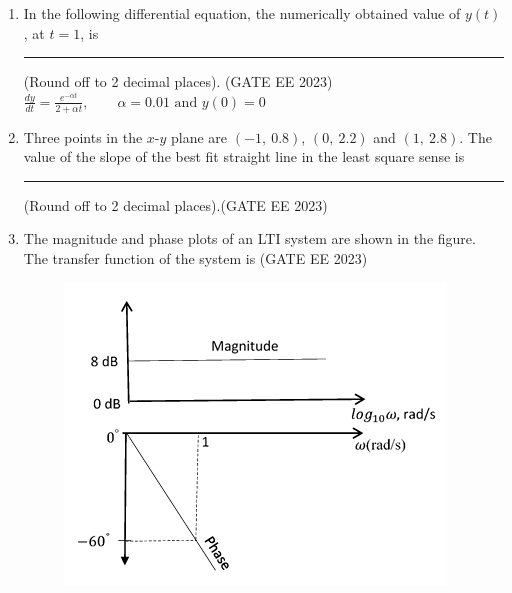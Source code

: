 \documentclass[a4paper,12pt]{exam}
\theoremstyle{remark}
\begin{document}
\begin{enumerate}
\item In the following differential equation, the numerically obtained value of $y(t)$, at $t=1$, is \rule{2cm}{0.15mm} (Round off to 2 decimal places).
\hfill{(GATE EE 2023)}\\
$
\frac{dy}{dt} = \frac{e^{-\alpha t}}{2 + \alpha t}, \qquad \alpha = 0.01 \text{ and } y(0) = 0
$

\item Three points in the $x$-$y$ plane are $(-1,~0.8)$, $(0,~2.2)$ and $(1,~2.8)$. The value of the slope of the best fit straight line in the least square sense is \rule{2cm}{0.15mm} (Round off to 2 decimal places).\hfill{(GATE EE 2023)}
\newpage
\item The magnitude and phase plots of an LTI system are shown in the figure. The 
transfer function of the system is \hfill{(GATE EE 2023)}
\begin{figure}[H]
    \centering
    \includegraphics[width=0.5\columnwidth]{figs/Q 36.png}
    \caption{}
    \label{fig:placeholder}
\end{figure}


\end{enumerate}
\end{document}
